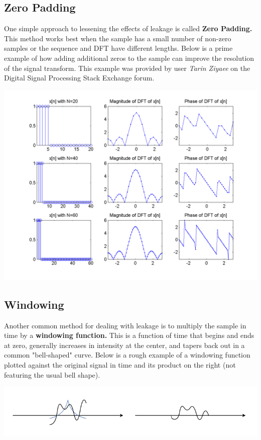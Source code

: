 \documentclass[12pt]{article}
\begin{document}
\subsection{Zero Padding}
One simple approach to lessening the effects of leakage is called \textbf{Zero Padding.} This method works best when the sample has a small number of non-zero samples or the sequence and DFT have different lengths. Below is a prime example of how adding additional zeros to the sample can improve the resolution of the signal transform. This example was provided by 	user \textit{Tarin Ziyaee} on the Digital Signal Processing Stack Exchange forum.

\begin{center}
\includegraphics[scale=0.6]{zero_padding}
\end{center}

\subsection{Windowing}
Another common method for dealing with leakage is to multiply the sample in time by a \textbf{windowing function.} This is a function of time that begins and ends at zero, generally increases in intensity at the center, and tapers back out in a common "bell-shaped" curve. Below is a rough example of a windowing function plotted against the original signal in time and its product on the right (not featuring the usual bell shape).
\begin{center}
\includegraphics[scale=0.6]{windowinggraphs_windowed}
\end{center}
\end{document}
